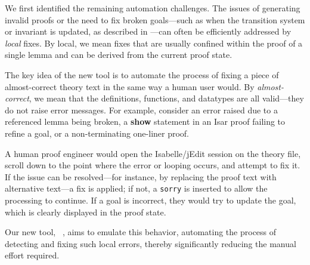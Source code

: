 \documentclass[10pt,conference]{IEEEtran}
\newcommand{\isakw}[1]{{\bfseries\ttfamily\def\isachardot{.}\def\isacharunderscore{\isacharunderscorekeyword}%
\def\isacharbraceleft{\{}\def\isacharbraceright{\}}#1}}
\renewcommand{\isacommand}[1]{\textcolor{IsaBlue}{\isakw{#1}}}
\begin{document}
We first identified the remaining automation challenges. The issues of \sledgehammer{} generating invalid proofs or the need to fix broken goals—such as when the transition system or invariant is updated, as described in —can often be efficiently addressed by \emph{local} fixes. By local, we mean fixes that are usually confined within the proof of a single lemma and can be derived from the current proof state.


The key idea of the new tool is to automate the process of fixing a piece of almost-correct theory text in the same way a human user would. By \emph{almost-correct}, we mean that the definitions, functions, and datatypes are all valid—they do not raise error messages. For example, consider an error raised due to a referenced lemma being broken, a \isacommand{show} statement in an Isar proof failing to refine a goal, or a non-terminating one-liner proof.



A human proof engineer would open the Isabelle/jEdit session on the theory file, scroll down to the point where the error or looping occurs, and attempt to fix it. If the issue can be resolved—for instance, by replacing the proof text with alternative text—a fix is applied; if not, a \texttt{sorry} is inserted to allow the processing to continue. If a goal is incorrect, they would try to update the goal, which is clearly displayed in the proof state.


Our new tool, \superfix{}~\cite{zenodoRepo}, aims to emulate this behavior, automating the process of detecting and fixing such local errors, thereby significantly reducing the manual effort required.




\smallskip\noindent
\end{document}

